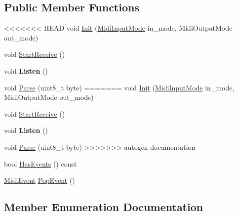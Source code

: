 \subsection*{Public Member Functions}
\begin{DoxyCompactItemize}
\item 
<<<<<<< HEAD
void \hyperlink{classdaisy_1_1_midi_handler_a1279f2e3e67adb676a0fe550a9c22221}{Init} (\hyperlink{classdaisy_1_1_midi_handler_acc2df91e9c18571da6edecaec4fbc7fe}{Midi\+Input\+Mode} in\+\_\+mode, Midi\+Output\+Mode out\+\_\+mode)
\item 
void \hyperlink{classdaisy_1_1_midi_handler_aec305ba283ba3efdc0e95c822e87040b}{Start\+Receive} ()
\item 
\mbox{\label{classdaisy_1_1_midi_handler_ac2ca9597f4c77060935dc69dec399c35}} 
void {\bfseries Listen} ()
\item 
void \hyperlink{classdaisy_1_1_midi_handler_a6ad7f3e96e321775266f4e58d356c2a9}{Parse} (uint8\+\_\+t byte)
=======
void \hyperlink{classdaisy_1_1_midi_handler_ace46e147ccd584f0bc9aecd3cde9345d}{Init} (\hyperlink{classdaisy_1_1_midi_handler_acc2df91e9c18571da6edecaec4fbc7fe}{Midi\+Input\+Mode} in\+\_\+mode, Midi\+Output\+Mode out\+\_\+mode)
\item 
void \hyperlink{classdaisy_1_1_midi_handler_a8e76d18b87a9578f7c47975fd2cd172a}{Start\+Receive} ()
\item 
\mbox{\label{classdaisy_1_1_midi_handler_abb8b8db07248d9baa4bfcbd6e08c4c86}} 
void {\bfseries Listen} ()
\item 
void \hyperlink{classdaisy_1_1_midi_handler_a662328ecadf42d9d2424e845fcd71915}{Parse} (uint8\+\_\+t byte)
>>>>>>> autogen documentation
\item 
bool \hyperlink{classdaisy_1_1_midi_handler_a8c0750453834eae67cf1c1ae6544d5bb}{Has\+Events} () const
\item 
\hyperlink{structdaisy_1_1_midi_event}{Midi\+Event} \hyperlink{classdaisy_1_1_midi_handler_a1d88de50782d9b561b1862e3dd5ca566}{Pop\+Event} ()
\end{DoxyCompactItemize}


\subsection{Member Enumeration Documentation}
\mbox{\label{classdaisy_1_1_midi_handler_acc2df91e9c18571da6edecaec4fbc7fe}} 
